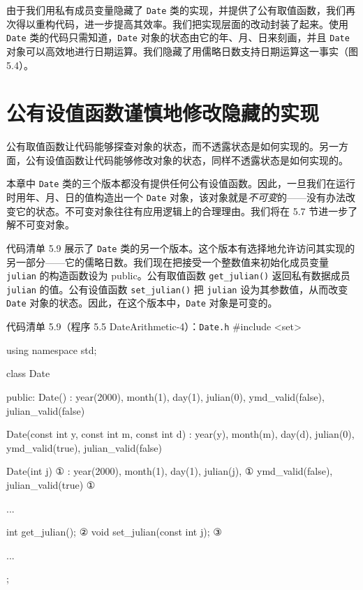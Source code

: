 
由于我们用私有成员变量隐藏了 \texttt{Date} 类的实现，并提供了公有取值函数，我们再次得以重构代码，进一步提高其效率。我们把实现层面的改动封装了起来。使用 \texttt{Date} 类的代码只需知道，\texttt{Date} 对象的状态由它的年、月、日来刻画，并且 \texttt{Date} 对象可以高效地进行日期运算。我们隐藏了用儒略日数支持日期运算这一事实（图 5.4）。


\section{公有设值函数谨慎地修改隐藏的实现}

公有取值函数让代码能够探查对象的状态，而不透露状态是如何实现的。另一方面，公有设值函数让代码能够修改对象的状态，同样不透露状态是如何实现的。

本章中 \texttt{Date} 类的三个版本都没有提供任何公有设值函数。因此，一旦我们在运行时用年、月、日的值构造出一个 \texttt{Date} 对象，该对象就是\emph{不可变}的——没有办法改变它的状态。不可变对象往往有应用逻辑上的合理理由。我们将在 5.7 节进一步了解不可变对象。

代码清单 5.9 展示了 \texttt{Date} 类的另一个版本。这个版本有选择地允许访问其实现的另一部分——它的儒略日数。我们现在把接受一个整数值来初始化成员变量 \texttt{julian} 的构造函数设为 public。公有取值函数 \texttt{get\_\allowbreak{}julian(\allowbreak{})\allowbreak{}} 返回私有数据成员 \texttt{julian} 的值。公有设值函数 \texttt{set\_\allowbreak{}julian(\allowbreak{})\allowbreak{}} 把 \texttt{julian} 设为其参数值，从而改变 \texttt{Date} 对象的状态。因此，在这个版本中，\texttt{Date} 对象是可变的。

\begin{codeboxt}{代码清单 5.9（程序 5.5 DateArithmetic-4）：\texttt{Date.h}}
#include <set>

using namespace std;

class Date
{
public:
    Date()
        : year(2000), month(1), day(1), julian(0),
          ymd_valid(false), julian_valid(false) {}

    Date(const int y, const int m, const int d)
        : year(y), month(m), day(d), julian(0),
          ymd_valid(true), julian_valid(false) {}

    Date(int j)                                     ①
        : year(2000), month(1), day(1), julian(j),  ①
          ymd_valid(false), julian_valid(true) {}   ①

    ...

    int get_julian();                               ②
    void set_julian(const int j);                   ③

    ...
};
\end{codeboxt}
\par
{}\par
{}\par

